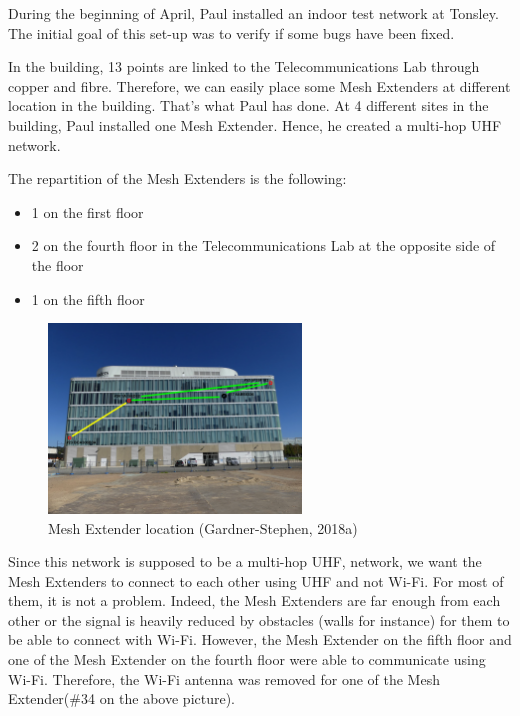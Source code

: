 During the beginning of April, Paul installed an indoor test network at Tonsley.
The initial goal of this set-up was to verify if some bugs have been fixed. 

In the building, 13 points are linked to the Telecommunications Lab through copper and fibre. Therefore, we can easily place some Mesh Extenders at different location in the building. That's what Paul has done. 
At 4 different sites in the building, Paul installed one Mesh Extender. Hence, he created a multi-hop UHF network.

The repartition of the Mesh Extenders is the following:
\begin{itemize}
	\item 1 on the first floor
	\item 2 on the fourth floor
		 in the Telecommunications Lab
		 at the opposite side of the floor
	\item 1 on the fifth floor	
\end{itemize}
	

\begin{figure}[H]
	\centering
	\includegraphics[width=0.6\textwidth]{image/TonsleyMeshExtenderLocations.png}
	\caption{Mesh Extender location (Gardner-Stephen, 2018a)}
	\label{fig:figure3}
\end{figure}


Since this network is supposed to be a multi-hop UHF, network, we want the Mesh Extenders to connect to each other using UHF and not Wi-Fi. For most of them, it is not a problem. Indeed, the Mesh Extenders are far enough from each other or the signal is heavily reduced by obstacles (walls for instance) for them to be able to connect with Wi-Fi.
However, the Mesh Extender on the fifth floor and one of the Mesh Extender on the fourth floor were able to communicate using Wi-Fi. Therefore, the Wi-Fi antenna was removed for one of the Mesh Extender(\#34 on the above picture).

